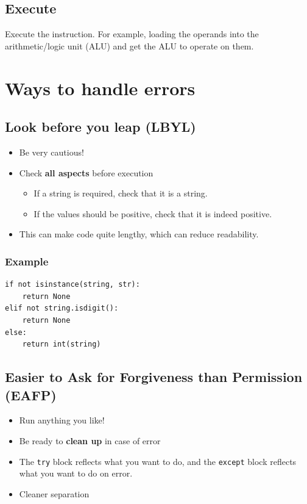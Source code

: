 \documentclass[11pt]{article}
\begin{document}
\subsection{Execute}
\label{sec:org75aeb17}
Execute the instruction. For example, loading the operands into the arithmetic/logic unit (ALU) and get the ALU to operate on them.

 \newpage

\section{Ways to handle errors}
\label{sec:org3a9925d}

\subsection{Look before you leap (LBYL)}
\label{sec:orgb0fc951}
\begin{itemize}
\item Be very cautious!
\item Check \textbf{all aspects} before execution
\begin{itemize}
\item If a string is required, check that it is a string.
\item If the values should be positive, check that it is indeed positive.
\end{itemize}
\item This can make code quite lengthy, which can reduce readability.
\end{itemize}

\subsubsection{Example}
\label{sec:orge41c51d}
\begin{verbatim}
if not isinstance(string, str):
    return None
elif not string.isdigit():
    return None
else:
    return int(string)
\end{verbatim}

\subsection{Easier to Ask for Forgiveness than Permission (EAFP)}
\label{sec:org7afc965}
\begin{itemize}
\item Run anything you like!
\item Be ready to \textbf{clean up} in case of error
\item The \texttt{try} block reflects what you want to do, and the \texttt{except} block reflects what you want to do on error.
\item Cleaner separation
\end{itemize}
\end{document}

